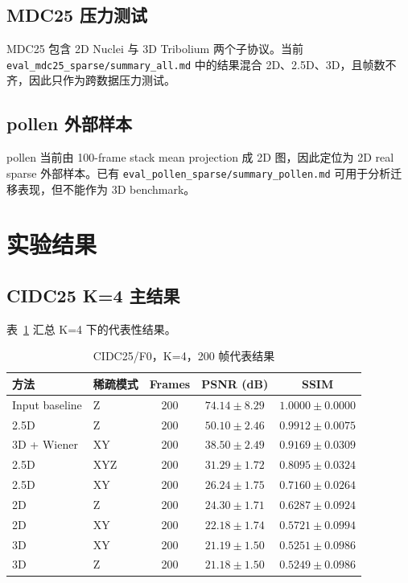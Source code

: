 \documentclass[UTF8, scheme=plain, 11pt, a4paper]{ctexart}
\begin{document}
\subsection{MDC25 压力测试}

MDC25 包含 2D Nuclei 与 3D Tribolium 两个子协议。当前 \texttt{eval\_mdc25\_sparse/summary\_all.md} 中的结果混合 2D、2.5D、3D，且帧数不齐，因此只作为跨数据压力测试。

\subsection{pollen 外部样本}

pollen 当前由 100-frame stack mean projection 成 2D 图，因此定位为 2D real sparse 外部样本。已有 \texttt{eval\_pollen\_sparse/summary\_pollen.md} 可用于分析迁移表现，但不能作为 3D benchmark。

\section{实验结果}

\subsection{CIDC25 K=4 主结果}

表~\ref{tab:cidc25_k4} 汇总 K=4 下的代表性结果。

\begin{table}[H]
  \centering
  \caption{CIDC25/F0，K=4，200 帧代表结果}
  \label{tab:cidc25_k4}
  \begin{tabular}{llccc}
    \toprule
    方法 & 稀疏模式 & Frames & PSNR (dB) & SSIM \\
    \midrule
    Input baseline & Z & 200 & $74.14\pm8.29$ & $1.0000\pm0.0000$ \\
    2.5D & Z & 200 & $50.10\pm2.46$ & $0.9912\pm0.0075$ \\
    3D + Wiener & XY & 200 & $38.50\pm2.49$ & $0.9169\pm0.0309$ \\
    2.5D & XYZ & 200 & $31.29\pm1.72$ & $0.8095\pm0.0324$ \\
    2.5D & XY & 200 & $26.24\pm1.75$ & $0.7160\pm0.0264$ \\
    2D & Z & 200 & $24.30\pm1.71$ & $0.6287\pm0.0924$ \\
    2D & XY & 200 & $22.18\pm1.74$ & $0.5721\pm0.0994$ \\
    3D & XY & 200 & $21.19\pm1.50$ & $0.5251\pm0.0986$ \\
    3D & Z & 200 & $21.18\pm1.50$ & $0.5249\pm0.0986$ \\
    \bottomrule
  \end{tabular}
\end{table}
\end{document}
